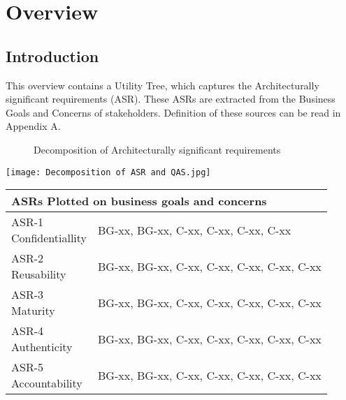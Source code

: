 \chapter{Overview}\label{s:overview}
\section{Introduction}
This overview contains a Utility Tree, which captures the Architecturally significant requirements (ASR). These ASRs are extracted from the Business Goals and Concerns of stakeholders. Definition of these sources can be read in Appendix A.\\
\graphicspath{ {./images/} }
\begin{figure}[t]
\centering
\caption{Decomposition of Architecturally significant requirements}
\label{fig:mesh1}
\end{figure}
\texttt{[image: Decomposition of ASR and QAS.jpg]}\\
\begin{tabular}{ |p{3cm}||p{10cm}|}
 \hline
 \multicolumn{2}{|l|}{ASRs Plotted on business goals and concerns} \\
 \hline
 \makecell{ASR-1 \\ Confidentiallity} & BG-xx, BG-xx, C-xx, C-xx, C-xx, C-xx\\
  \hline
 \makecell{ASR-2 \\ Reusability} & BG-xx, BG-xx, C-xx, C-xx, C-xx, C-xx, C-xx  \\
  \hline
 \makecell{ASR-3 \\ Maturity} & BG-xx, BG-xx, C-xx, C-xx, C-xx, C-xx, C-xx \\
  \hline
  \makecell{ASR-4 \\ Authenticity} & BG-xx, BG-xx, C-xx, C-xx, C-xx, C-xx, C-xx\\
  \hline
  \makecell{ASR-5 \\ Accountability} & BG-xx, BG-xx, C-xx, C-xx, C-xx, C-xx, C-xx \\
 \hline
\end{tabular}


